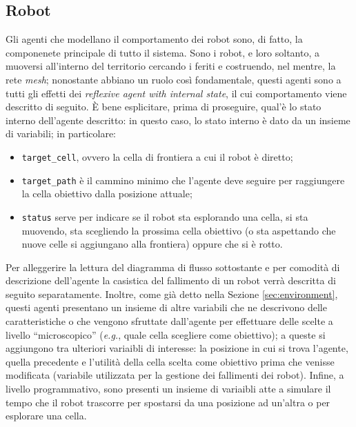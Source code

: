 \subsection{Robot}
\label{sub:robots}
Gli agenti che modellano il comportamento dei robot sono, di fatto, la componenete principale di tutto il sistema.
Sono i robot, e loro soltanto, a muoversi all'interno del territorio cercando i feriti e costruendo, nel mentre, la rete \textit{mesh}; nonostante abbiano un ruolo così fondamentale, questi agenti sono a tutti gli effetti dei \textit{reflexive agent with internal state}, il cui comportamento viene descritto di seguito.
È bene esplicitare, prima di proseguire, qual'è lo stato interno dell'agente descritto: in questo caso, lo stato interno è dato da un insieme di variabili; in particolare:
\begin{itemize}
	\item \texttt{target\_cell}, ovvero la cella di frontiera a cui il robot è diretto;
	\item \texttt{target\_path} è il cammino minimo che l'agente deve seguire per raggiungere la cella obiettivo dalla posizione attuale;
	\item \texttt{status} serve per indicare se il robot sta esplorando una cella, si sta muovendo, sta scegliendo la prossima cella obiettivo (o sta aspettando che nuove celle si aggiungano alla frontiera) oppure che si è rotto.
\end{itemize}
Per alleggerire la lettura del diagramma di flusso sottostante e per comodità di descrizione dell'agente la casistica del fallimento di un robot verrà descritta di seguito separatamente.
Inoltre, come già detto nella Sezione \ref{sec:environment}, questi agenti presentano un insieme di altre variabili che ne descrivono delle caratteristiche o che vengono sfruttate dall'agente per effettuare delle scelte a livello “microscopico” (\textit{e.g.}, quale cella scegliere come obiettivo); a queste si aggiungono tra ulteriori variaibli di interesse: la posizione in cui si trova l'agente, quella precedente e l'utilità della cella scelta come obiettivo prima che venisse modificata (variabile utilizzata per la gestione dei fallimenti dei robot).
Infine, a livello programmativo, sono presenti un insieme di variaibli atte a simulare il tempo che il robot trascorre per spostarsi da una posizione ad un'altra o per esplorare una cella. 

